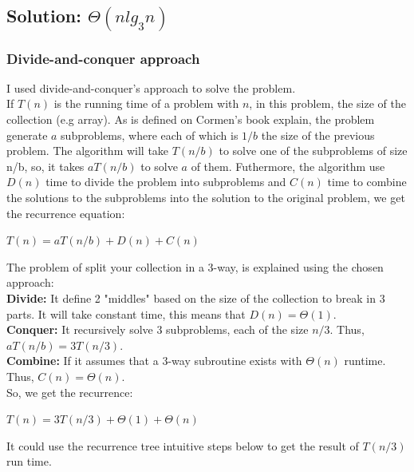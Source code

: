 \subsection{Solution: $\Theta(n lg_3 n)$}

\subsubsection{Divide-and-conquer approach}

I used divide-and-conquer's approach to solve the problem. \\

If $T(n)$ is the running time of a problem with $n$, in this problem, the size of the collection (e.g array). As is defined on Cormen's book explain, the problem generate $a$ subproblems, where each of which is $1/b$ the size of the previous problem. The algorithm will take $T(n/b)$ to solve one of the subproblems of size n/b, so, it takes $aT(n/b)$ to solve $a$ of them. Futhermore, the algorithm use $D(n)$ time to divide the problem into subproblems and $C(n)$ time to combine the solutions to the subproblems into the solution to the original problem, we get the recurrence equation: \\

\begin{center}
    $T(n) = aT(n/b) + D(n) + C(n)$
\end{center}

The problem of split your collection in a 3-way, is explained using the chosen approach: \\

\textbf{Divide:} It define 2 "middles" based on the size of the collection to break in 3 parts. It will take constant time, this means that $D(n) = \Theta (1)$. \\

\textbf{Conquer:} It recursively solve 3 subproblems, each of the size $n/3$. Thus, $aT(n/b) = 3T(n/3)$. \\

\textbf{Combine:} If it assumes that a 3-way subroutine exists with $\Theta (n)$ runtime. Thus, $C(n) = \Theta (n)$. \\

So, we get the recurrence:

\begin{center}
    $T(n) = 3T(n/3) + \Theta (1) + \Theta (n)$
\end{center}

It could use the recurrence tree intuitive steps below to get the result of $T(n/3)$ run time. 

